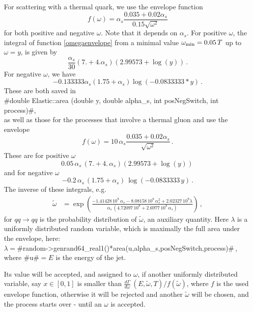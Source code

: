 For scattering with a thermal quark, we use the envelope function
\begin{equation}\label{omegaenvelope}
  f(\omega)=\alpha_s\frac{0.035 + 0.02 \alpha_s}{0.15 \sqrt{\omega^2}}
\end{equation}
for both positive and negative $\omega$. Note that it depends on $\alpha_s$.
For positive $\omega$, the integral of function \ref{omegaenvelope} 
from a minimal value $\omega_{\rm min}=0.05\,T$ up to $\omega = y$, is given by
\begin{equation}
  \frac{\alpha_s}{30}(7.+ 4.\alpha_s)(2.99573+\log(y))\,.
\end{equation}
For negative $\omega$, we have
\begin{equation}
  -0.133333 \alpha_s(1.75+\alpha_s)\log(-0.0833333*y)\,.
\end{equation}
These are both saved in\\ 
#double Elastic::area (double y, double alpha_s, int posNegSwitch, int process)#,\\ 
as well as those for the processes that involve a thermal gluon and use the envelope
\begin{equation}\label{omegaenvelope}
  f(\omega)=10\, \alpha_s\frac{0.035 + 0.02 \alpha_s}{\sqrt{\omega^2}}\,.
\end{equation}
These are for positive $\omega$
\begin{equation}
  0.05\,\alpha_s\,(7.+ 4.\,\alpha_s)(2.99573+\log(y))\,
\end{equation}
and for negative $\omega$
\begin{equation}
 -0.2\,\alpha_s\,(1.75+\alpha_s)\,\log(-0.0833333\,y)\,.
\end{equation}
The inverse of these integrals, e.g.
\begin{align}
  \tilde{\omega} &= \exp\left(\frac{-1.41428\,10^9\,\alpha_s - 8.08158\,10^8\,\alpha_s^2 + 2.02327\,10^9 \lambda}{\alpha_s\,(4.72097\,10^8 + 2.6977\,10^8\,\alpha_s)}\right)\,,
\end{align}
for $qq \rightarrow qq$ is the probability distribution of $\tilde{\omega}$, 
an auxiliary quantity. Here $\lambda$ is a uniformly distributed random variable, 
which is maximally the full area under the envelope, here:\\
$\lambda=$#random->genrand64_real1()*area(u,alpha_s,posNegSwitch,process)#\,, 
where #u#$=E$ is the energy of the jet.

Its value will be accepted, and assigned to $\omega$, if another uniformly 
distributed variable, say $x \in [0,1]$ is smaller than 
$\frac{d\Gamma}{d\omega}~(E,\tilde{\omega},T)/f(\tilde{\omega})$, 
where $f$ is the used envelope function, otherwise it will be rejected 
and another $\tilde{\omega}$ will be chosen, and the process starts over 
 - until an $\omega$ is accepted.

